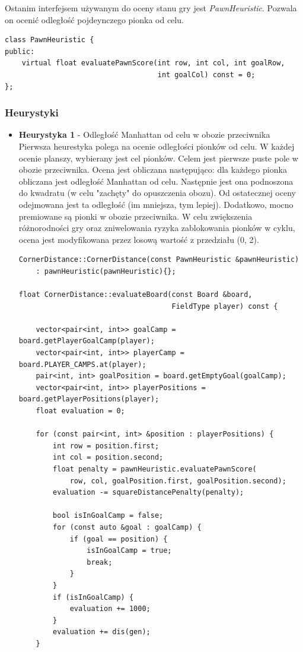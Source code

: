 \documentclass[a4paper, 12pt]{article}
\begin{document}
Ostanim interfejsem używanym do oceny stanu gry jest \textit{PawnHeuristic}.
Pozwala on ocenić odległość pojdeynczego pionka od celu.
\begin{lstlisting}
class PawnHeuristic {
public:
    virtual float evaluatePawnScore(int row, int col, int goalRow,
                                    int goalCol) const = 0;
};
\end{lstlisting}


\subsubsection{Heurystyki}
\begin{itemize}
  \item \textbf{Heurystyka 1} - Odległość Manhattan od celu w obozie przeciwnika\\
  Pierwsza heurestyka polega na ocenie odległości pionków od celu.
  W każdej ocenie planszy, wybierany jest cel pionków. 
  Celem jest pierwsze puste pole w obozie przeciwnika.
  Ocena jest obliczana następująco:
  dla każdego pionka obliczana jest odległość Manhattan od celu.
  Następnie jest ona podnoszona do kwadratu (w celu "zachęty" do opuszczenia obozu).
  Od ostatecznej oceny odejmowana jest ta odległość (im mniejsza, tym lepiej).
  Dodatkowo, mocno premiowane są pionki w obozie przeciwnika. W celu 
  zwiększenia różnorodności gry oraz zniwelowania ryzyka zablokowania 
  pionków w cyklu, ocena jest modyfikowana przez losową wartość z przedziału (0, 2).
\begin{lstlisting}
CornerDistance::CornerDistance(const PawnHeuristic &pawnHeuristic)
    : pawnHeuristic(pawnHeuristic){};

float CornerDistance::evaluateBoard(const Board &board,
                                    FieldType player) const {

    vector<pair<int, int>> goalCamp = board.getPlayerGoalCamp(player);
    vector<pair<int, int>> playerCamp = board.PLAYER_CAMPS.at(player);
    pair<int, int> goalPosition = board.getEmptyGoal(goalCamp);
    vector<pair<int, int>> playerPositions = board.getPlayerPositions(player);
    float evaluation = 0;

    for (const pair<int, int> &position : playerPositions) {
        int row = position.first;
        int col = position.second;
        float penalty = pawnHeuristic.evaluatePawnScore(
            row, col, goalPosition.first, goalPosition.second);
        evaluation -= squareDistancePenalty(penalty);

        bool isInGoalCamp = false;
        for (const auto &goal : goalCamp) {
            if (goal == position) {
                isInGoalCamp = true;
                break;
            }
        }
        if (isInGoalCamp) {
            evaluation += 1000;
        }
        evaluation += dis(gen);
    }


\end{lstlisting}
\end{itemize}
\end{document}
